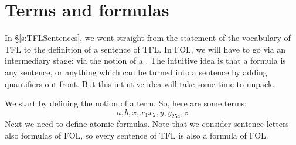 \section{Terms and formulas}
\label{s:TermsFormulas}

In \S\ref{s:TFLSentences}, we went straight from the statement of the vocabulary of TFL to the definition of a sentence of TFL. In FOL, we will have to go via an intermediary stage: via the notion of a . The intuitive idea is that a formula is any sentence, or anything which can be turned into a sentence by adding quantifiers out front. But this intuitive idea will take some time to unpack.

We start by defining the notion of a term.
So, here are some terms:
	$$a, b, x, x_1 x_2, y, y_{254}, z$$
Next we need to define atomic formulas.
Note that we consider sentence letters also formulas of FOL, so every sentence of TFL is also a formula of FOL.




